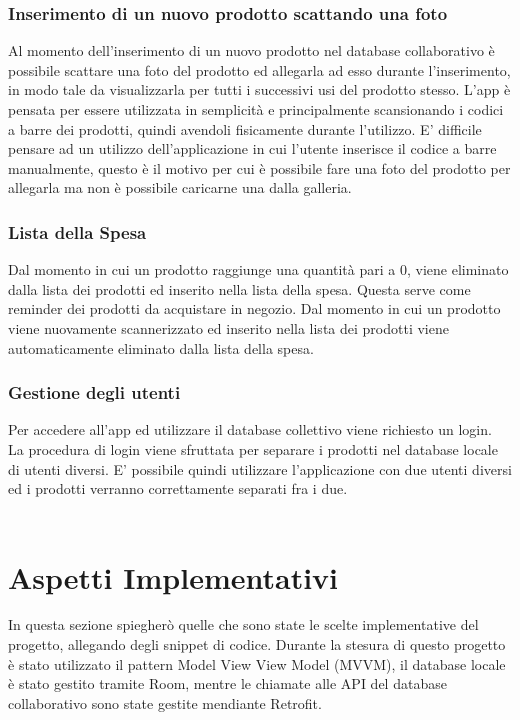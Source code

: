 \documentclass[12pt]{article}
\begin{document}
    \subsubsection{Inserimento di un nuovo prodotto scattando una foto}
    Al momento dell'inserimento di un nuovo prodotto nel database collaborativo è possibile scattare una foto del prodotto ed allegarla ad esso
    durante l'inserimento, in modo tale da visualizzarla per tutti i successivi usi del prodotto stesso. L'app è pensata per essere utilizzata in
    semplicità e principalmente scansionando i codici a barre dei prodotti, quindi avendoli fisicamente durante l'utilizzo. E' difficile pensare
    ad un utilizzo dell'applicazione in cui l'utente inserisce il codice a barre manualmente, questo è il motivo per cui è possibile fare una foto
    del prodotto per allegarla ma non è possibile caricarne una dalla galleria.
    \subsubsection{Lista della Spesa}
    Dal momento in cui un prodotto raggiunge una quantità pari a 0, viene eliminato dalla lista dei prodotti ed inserito nella lista della spesa.
    Questa serve come reminder dei prodotti da acquistare in negozio. Dal momento in cui un prodotto viene nuovamente scannerizzato ed inserito
    nella lista dei prodotti viene automaticamente eliminato dalla lista della spesa.
    \subsubsection{Gestione degli utenti}
    Per accedere all'app ed utilizzare il database collettivo viene richiesto un login. La procedura di login viene sfruttata per separare i prodotti
    nel database locale di utenti diversi. E' possibile quindi utilizzare l'applicazione con due utenti diversi ed i prodotti verranno correttamente 
    separati fra i due.\\ \\
    \section{Aspetti Implementativi}
    In questa sezione spiegherò quelle che sono state le scelte implementative del progetto, allegando degli snippet di codice. Durante 
    la stesura di questo progetto è stato utilizzato il pattern Model View View Model (MVVM), il database locale è stato gestito tramite Room, mentre le 
    chiamate alle API del database collaborativo sono state gestite mendiante Retrofit.
\end{document}

